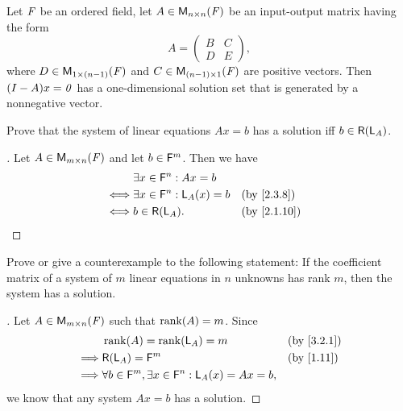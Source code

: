 \begin{thm}\label{3.12}
	Let \(\mathit{F}\) be an ordered field, let \(A \in \mathsf{M}_{{n} \times n}({\mathit{F}})\) be an input-output matrix having the form
	\[
		A = \begin{pmatrix}
			B & C \\
			D & E
		\end{pmatrix},
	\]
	where \(D \in \mathsf{M}_{{1} \times (n - 1)}({\mathit{F}})\) and \(C \in \mathsf{M}_{{(n - 1)} \times 1}({\mathit{F}})\) are positive vectors.
	Then \((I - A)x = \mathit{0}\) has a one-dimensional solution set that is generated by a nonnegative vector.
\end{thm}

\exercisesection

\setcounter{ex}{8}
\begin{ex}\label{ex:3.3.9}
	Prove that the system of linear equations \(Ax = b\) has a solution iff \(b \in \rg{\L_A}\).
\end{ex}

\begin{proof}[]
	Let \(A \in \mathsf{M}_{{m} \times n}({\mathit{F}})\) and let \(b \in \mathsf{F}^m\).
	Then we have
	\begin{align*}
		     & \exists x \in \vs{F}^n : Ax = b                       \\
		\iff & \exists x \in \vs{F}^n : \L_A(x) = b &  & \by{2.3.8}  \\
		\iff & b \in \rg{\L_A}.                     &  & \by{2.1.10}
	\end{align*}
\end{proof}

\begin{ex}\label{ex:3.3.10}
	Prove or give a counterexample to the following statement:
	If the coefficient matrix of a system of \(m\) linear equations in \(n\) unknowns has rank \(m\), then the system has a solution.
\end{ex}

\begin{proof}[]
	Let \(A \in \mathsf{M}_{{m} \times n}({\mathit{F}})\) such that \(\rk{A} = m\).
	Since
	\begin{align*}
		         & \rk{A} = \rk{\L_A} = m                                             &  & \by{3.2.1} \\
		\implies & \rg{\L_A} = \vs{F}^m                                               &  & \by{1.11}  \\
		\implies & \forall b \in \vs{F}^m, \exists x \in \vs{F}^n : \L_A(x) = Ax = b,
	\end{align*}
	we know that any system \(Ax = b\) has a solution.
\end{proof}
